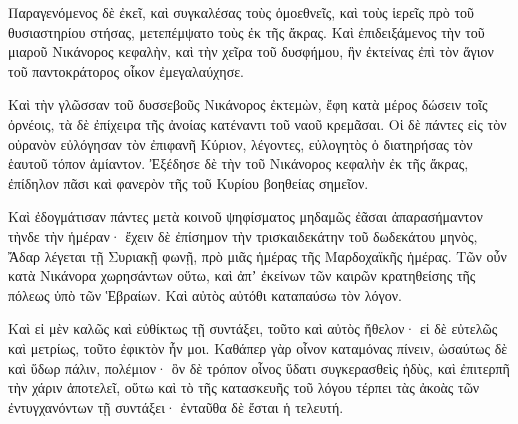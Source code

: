 {\par }{\PP {}Παραγενόμενος δὲ ἐκεῖ, καὶ συγκαλέσας τοὺς ὁμοεθνεῖς, καὶ τοὺς ἱερεῖς πρὸ τοῦ θυσιαστηρίου στήσας, μετεπέμψατο τοὺς ἐκ τῆς ἄκρας.
Καὶ ἐπιδειξάμενος τὴν τοῦ μιαροῦ Νικάνορος κεφαλὴν, καὶ τὴν χεῖρα τοῦ δυσφήμου, ἣν ἐκτείνας ἐπὶ τὸν ἅγιον τοῦ παντοκράτορος οἶκον ἐμεγαλαύχησε.
\par }{\PP {}Καὶ τὴν γλῶσσαν τοῦ δυσσεβοῦς Νικάνορος ἐκτεμὼν, ἔφη κατὰ μέρος δώσειν τοῖς ὀρνέοις, τὰ δὲ ἐπίχειρα τῆς ἀνοίας κατέναντι τοῦ ναοῦ κρεμᾶσαι.
Οἱ δὲ πάντες εἰς τὸν οὐρανὸν εὐλόγησαν τὸν ἐπιφανῆ Κύριον, λέγοντες, εὐλογητὸς ὁ διατηρήσας τὸν ἑαυτοῦ τόπον ἀμίαντον.
Ἐξέδησε δὲ τὴν τοῦ Νικάνορος κεφαλὴν ἐκ τῆς ἄκρας, ἐπίδηλον πᾶσι καὶ φανερὸν τῆς τοῦ Κυρίου βοηθείας σημεῖον.
\par }{\PP {}Καὶ ἐδογμάτισαν πάντες μετὰ κοινοῦ ψηφίσματος μηδαμῶς ἐᾶσαι ἀπαρασήμαντον τὴνδε τὴν ἡμέραν· ἔχειν δὲ ἐπίσημον τὴν τρισκαιδεκάτην τοῦ δωδεκάτου μηνὸς, Ἄδαρ λέγεται τῇ Συριακῇ φωνῇ, πρὸ μιᾶς ἡμέρας τῆς Μαρδοχαϊκῆς ἡμέρας.
Τῶν οὖν κατὰ Νικάνορα χωρησάντων οὕτω, καὶ ἀπʼ ἐκείνων τῶν καιρῶν κρατηθείσης τῆς πόλεως ὑπὸ τῶν Ἑβραίων. Καὶ αὐτὸς αὐτόθι καταπαύσω τὸν λόγον.
\par }{\PP {}Καὶ εἰ μὲν καλῶς καὶ εὐθίκτως τῇ συντάξει, τοῦτο καὶ αὐτὸς ἤθελον· εἰ δὲ εὐτελῶς καὶ μετρίως, τοῦτο ἐφικτὸν ἦν μοι.
Καθάπερ γὰρ οἶνον καταμόνας πίνειν, ὡσαύτως δὲ καὶ ὕδωρ πάλιν, πολέμιον· ὃν δὲ τρόπον οἶνος ὕδατι συγκερασθεὶς ἡδὺς, καὶ ἐπιτερπῆ τὴν χάριν ἀποτελεῖ, οὕτω καὶ τὸ τῆς κατασκευῆς τοῦ λόγου τέρπει τὰς ἀκοὰς τῶν ἐντυγχανόντων τῇ συντάξει· ἐνταῦθα δὲ ἔσται ἡ τελευτή.
\par }